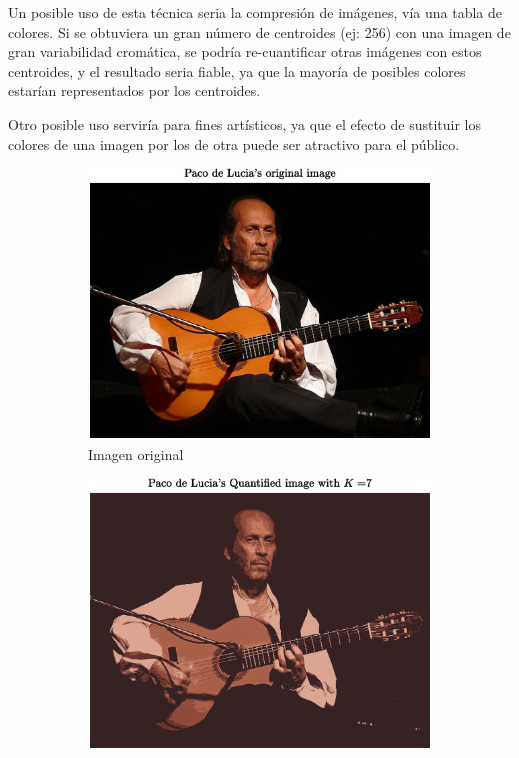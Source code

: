 \documentclass[11pt]{article} %
\begin{document}
Un posible uso de esta técnica seria la compresión de imágenes, vía una tabla de
colores. Si se obtuviera un gran número de centroides (ej: 256) con una imagen
de gran variabilidad cromática, se podría re-cuantificar otras imágenes con
estos centroides, y el resultado seria fiable, ya que la mayoría de posibles
colores estarían representados por los centroides.

Otro posible uso serviría para fines artísticos, ya que el efecto de sustituir
los colores de una imagen por los de otra puede ser atractivo para el público.

\begin{figure}[h]
    \centering
    \begin{subfigure}[b]{0.48\textwidth}
        \includegraphics[width=\textwidth]{../src/fig/22_paco_original.eps}
        \caption[]{Imagen original}
        \label{fig:22:paco:original}
    \end{subfigure}
    \quad
    \begin{subfigure}[b]{0.48\textwidth}
        \includegraphics[width=\textwidth]{../src/fig/22_paco_requant.eps}

\end{subfigure}
\end{figure}
\end{document}
